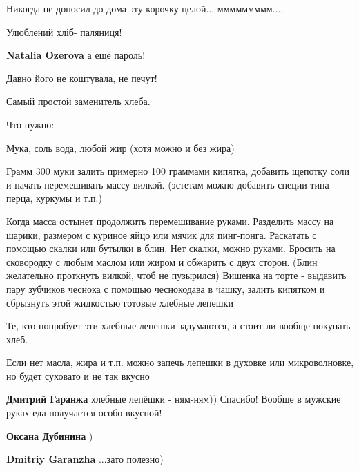  
 
 
 
 
\zzSecCmt

\begin{itemize} %
Никогда не доносил до дома эту корочку целой... ммммммммм....

Улюблений хліб- паляниця!

\textbf{Natalia Ozerova} а ещё пароль!

Давно його не коштувала, не печут!


Самый простой заменитель хлеба.

Что нужно:

Мука, соль вода, любой жир (хотя можно и без жира)

Грамм 300 муки залить примерно 100 граммами кипятка, добавить щепотку соли и
начать перемешивать массу вилкой. (эстетам можно добавить специи типа перца,
куркумы и т.п.)

Когда масса остынет продолжить перемешивание руками. Разделить массу на шарики,
размером с куриное яйцо или мячик для пинг-понга. Раскатать с помощью скалки
или бутылки в блин. Нет скалки, можно руками. Бросить на сковородку с любым
маслом или жиром и обжарить с двух сторон. (Блин желательно проткнуть вилкой,
чтоб не пузырился) Вишенка на торте - выдавить пару зубчиков чеснока с помощью
чеснокодава в чашку, залить кипятком и сбрызнуть этой жидкостью готовые хлебные
лепешки

Те, кто попробует эти хлебные лепешки задумаются, а стоит ли вообще покупать
хлеб.

Если нет масла, жира и т.п. можно запечь лепешки в духовке или микроволновке,
но будет суховато и не так вкусно

\begin{itemize} %
\textbf{Дмитрий Гаранжа} хлебные лепёшки - ням-ням)) Спасибо!
Вообще в мужские руках еда получается особо вкусной!

\textbf{Оксана Дубинина} )

\textbf{Dmitriy Garanzha} ...зато полезно)


\end{itemize}
\end{itemize}
